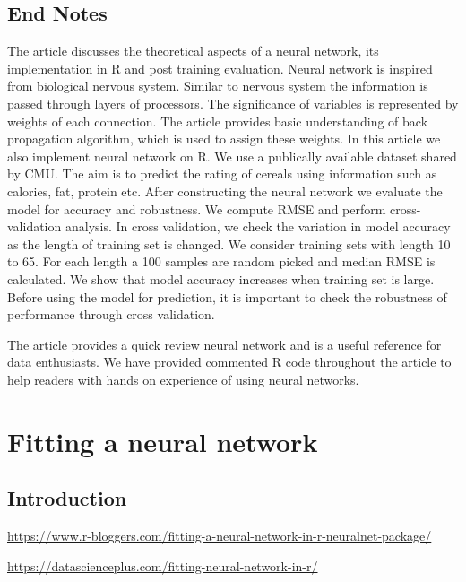 \documentclass[]{book}
\begin{document}
\hypertarget{end-notes}{%
\section{End Notes}\label{end-notes}}

The article discusses the theoretical aspects of a neural network, its implementation in R and post training evaluation. Neural network is inspired from biological nervous system. Similar to nervous system the information is passed through layers of processors. The significance of variables is represented by weights of each connection. The article provides basic understanding of back propagation algorithm, which is used to assign these weights. In this article we also implement neural network on R. We use a publically available dataset shared by CMU. The aim is to predict the rating of cereals using information such as calories, fat, protein etc. After constructing the neural network we evaluate the model for accuracy and robustness. We compute RMSE and perform cross-validation analysis. In cross validation, we check the variation in model accuracy as the length of training set is changed. We consider training sets with length 10 to 65. For each length a 100 samples are random picked and median RMSE is calculated. We show that model accuracy increases when training set is large. Before using the model for prediction, it is important to check the robustness of performance through cross validation.

The article provides a quick review neural network and is a useful reference for data enthusiasts. We have provided commented R code throughout the article to help readers with hands on experience of using neural networks.

\hypertarget{fitting-a-neural-network}{%
\chapter{Fitting a neural network}\label{fitting-a-neural-network}}

\hypertarget{introduction-7}{%
\section{Introduction}\label{introduction-7}}

\url{https://www.r-bloggers.com/fitting-a-neural-network-in-r-neuralnet-package/}

\url{https://datascienceplus.com/fitting-neural-network-in-r/}
\end{document}
